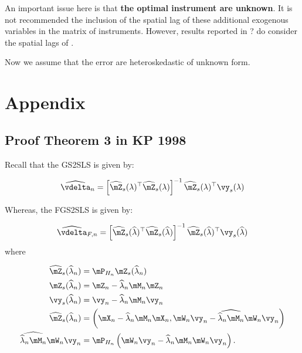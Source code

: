 \documentclass[english,12pt]{book}\usepackage[]{graphicx}\usepackage[]{xcolor}
\begin{document}
An important issue here is that \textbf{the optimal instrument are unknown}. It is not recommended the inclusion of the spatial lag of these additional exogenous variables in the matrix of instruments. However, results reported in ? do consider the spatial lags of . 

Now we assume that the error are heteroskedastic of unknown form. 





\section*{Appendix}


\begin{subappendices}

\section{Proof Theorem 3 in KP 1998}

Recall that the GS2SLS is given by:

\begin{equation}
  \widehat{\vdelta}_n = \left[\widehat{\mZ}_s(\lambda)^\top\widehat{\mZ}_s(\lambda)\right]^{-1}\widehat{\mZ}_s(\lambda)^\top\vy_s(\lambda)
\end{equation}

Whereas, the FGS2SLS is given by:

\begin{equation}
  \widehat{\vdelta}_{F, n} = \left[\widehat{\mZ}_s(\widehat{\lambda})^\top\widehat{\mZ}_s(\widehat{\lambda})\right]^{-1}\widehat{\mZ}_s(\widehat{\lambda})^\top\vy_s(\widehat{\lambda})
\end{equation}
%
where

\begin{equation}
  \begin{aligned}
    \widehat{\mZ}_s(\widehat{\lambda}_n) & = \mP_{H_n}\mZ_s(\widehat{\lambda}_n) \\
    \mZ_s(\widehat{\lambda}_n) & = \mZ_n - \widehat{\lambda}_n\mM_n\mZ_n \\
    \vy_s(\widehat{\lambda}_n) & = \vy_n - \widehat{\lambda}_n\mM_n\vy_n \\
    \widehat{\mZ}_s(\widehat{\lambda}_n) & = \left(\mX_n - \widehat{\lambda}_n\mM_n\mX_n, \mW_n\vy_n - \widehat{\widehat{\lambda}_n\mM_n}\mW_n\vy_n\right) \\
    \widehat{\widehat{\lambda}_n\mM_n}\mW_n\vy_n & = \mP_{H_n}\left(\mW_n\vy_n - \widehat{\lambda}_n\mM_n\mW_n\vy_n\right).
 \end{aligned}
\end{equation}


\end{subappendices}
\end{document}
